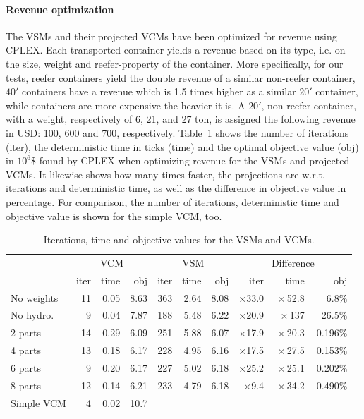 \documentclass{llncs}
\newcommand{\btablesize}{\begin{scriptsize}}
\newcommand{\etablesize}{\end{scriptsize}}
\begin{document}
\paragraph{Revenue optimization}
The VSMs and their projected VCMs have been optimized for revenue using CPLEX. Each transported container yields a revenue based on its type, i.e. on the size, weight and reefer-property of the container. More specifically, for our tests, reefer containers yield the double revenue of a similar non-reefer container, $40'$ containers have a revenue which is 1.5 times higher as a similar $20'$ container, while containers are more expensive the heavier it is. A $20'$, non-reefer container, with a weight, respectively of 6, 21, and 27 ton, is assigned the following revenue in USD: 100, 600 and 700, respectively. Table~\ref{tab:usingProjections} shows the number of iterations (iter), the deterministic time in ticks (time) and the optimal objective value (obj) in $10^6 \$$ found by CPLEX when optimizing revenue for the VSMs and projected VCMs. It likewise shows how many times faster, the projections are w.r.t. iterations and deterministic time, as well as the difference in objective value in percentage. For comparison, the number of iterations, deterministic time and objective value is shown for the simple VCM, too.

\begin{table}[tb]
\caption{Iterations, time and objective values for the VSMs and VCMs.}
\label{tab:usingProjections}
\centering
\btablesize
\begin{tabular}{l|r@{\:\;}r@{\:\;}r|r@{\:\;}r@{\:\:\:}r|rrr}
&\multicolumn{3}{c|}{VCM}&\multicolumn{3}{c|}{VSM}&\multicolumn{3}{c}{Difference}\\
					&iter&time  &obj 	 &iter  &time  &obj	&iter 			 &time					&obj\\ 
\hline
No weights&	11 & 0.05 & 8.63 &	363 & 2.64 &8.08&$\times$33.0&$\:\times$52.8&$\:$6.8$\%$\\
No hydro. &  9 & 0.04 & 7.87 &	188 & 5.48 &6.22&$\times$20.9&$\:\times$137 &$\:$26.5$\%$\\
2 parts		& 14 & 0.29 & 6.09 &	251 & 5.88 &6.07&$\times$17.9&$\:\times$20.3&$\:$0.196$\%$\\
4 parts 	& 13 & 0.18 & 6.17 &  228 & 4.95 &6.16&$\times$17.5&$\:\times$27.5&$\:$0.153$\%$\\
6 parts 	&  9 & 0.20 & 6.17 &  227 & 5.02 &6.18&$\times$25.2&$\:\times$25.1&$\:$0.202$\%$\\
8 parts 	& 12 & 0.14 & 6.21 &  233 & 4.79 &6.18&$\times$9.4&$\:\times$34.2&$\:$0.490$\%$\\
\bottomrule
Simple VCM&  4 & 0.02 &10.7\phantom{0}\\
\end{tabular}
\etablesize
\end{table}
\end{document}
